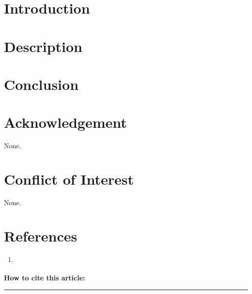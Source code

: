 \documentclass[10pt]{article} %
\begin{document}
\begin{multicols}{2}
\fontsize{9}{10.8}\selectfont\color{Black}

\section*{Introduction}
\section*{Description}

\section*{Conclusion}

\section*{Acknowledgement}
None.

\section*{Conflict of Interest}
None.

\section*{References}
\fontsize{8}{9.6}\selectfont
\begin{enumerate}
        \item \href{\VAR{item.url}}{ }
\end{enumerate}

\begin{framed}
\noindent\fontsize{8.5}{10.2}\selectfont
\textbf{How to cite this article:} 
\end{framed}


\end{multicols}

\vfill
\noindent
\hspace*{0pt}\color{Dark_Violet}\rule{\textwidth}{1pt}
\par\vspace{0.3cm} %
\end{document}
